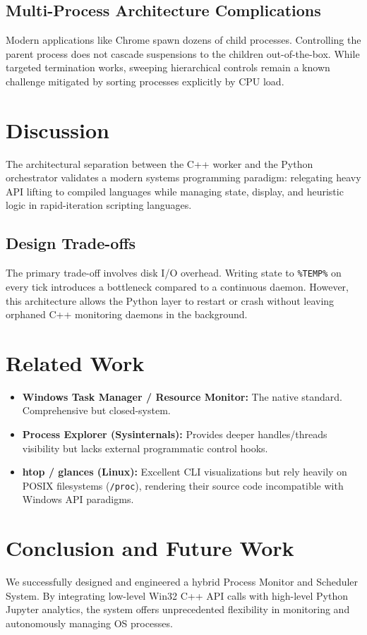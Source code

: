\documentclass{article}
\begin{document}
\subsection{Multi-Process Architecture Complications}
Modern applications like Chrome spawn dozens of child processes. Controlling the parent process does not cascade suspensions to the children out-of-the-box. While targeted termination works, sweeping hierarchical controls remain a known challenge mitigated by sorting processes explicitly by CPU load.

\section{Discussion}
The architectural separation between the C++ worker and the Python orchestrator validates a modern systems programming paradigm: relegating heavy API lifting to compiled languages while managing state, display, and heuristic logic in rapid-iteration scripting languages. 

\subsection{Design Trade-offs}
The primary trade-off involves disk I/O overhead. Writing state to \texttt{\%TEMP\%} on every tick introduces a bottleneck compared to a continuous daemon. However, this architecture allows the Python layer to restart or crash without leaving orphaned C++ monitoring daemons in the background.

\section{Related Work}
\begin{itemize}
    \item \textbf{Windows Task Manager / Resource Monitor:} The native standard. Comprehensive but closed-system.
    \item \textbf{Process Explorer (Sysinternals):} Provides deeper handles/threads visibility but lacks external programmatic control hooks.
    \item \textbf{htop / glances (Linux):} Excellent CLI visualizations but rely heavily on POSIX filesystems (\texttt{/proc}), rendering their source code incompatible with Windows API paradigms.
\end{itemize}

\section{Conclusion and Future Work}
We successfully designed and engineered a hybrid Process Monitor and Scheduler System. By integrating low-level Win32 C++ API calls with high-level Python Jupyter analytics, the system offers unprecedented flexibility in monitoring and autonomously managing OS processes.
\end{document}
